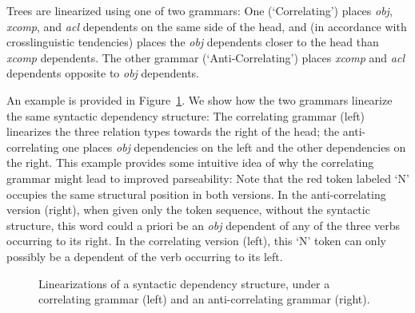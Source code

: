 \documentclass[10pt,twoside,lineno]{article}
\begin{document}
Trees are linearized using one of two grammars: One (`Correlating') places \emph{obj}, \emph{xcomp}, and \emph{acl} dependents on the same side of the head, and (in accordance with crosslinguistic tendencies) places the \emph{obj} dependents closer to the head than \emph{xcomp} dependents.
The other grammar (`Anti-Correlating') places \emph{xcomp} and \emph{acl} dependents opposite to \emph{obj} dependents.

An example is provided in Figure~\ref{fig:sent-dep}.
We show how the two grammars linearize the same syntactic dependency structure:
The correlating grammar (left) linearizes the three relation types towards the right of the head; the anti-correlating one places \emph{obj} dependencies on the left and the other dependencies on the right.
This example provides some intuitive idea of why the correlating grammar might lead to improved parseability:
Note that the red token labeled `N' occupies the same structural position in both versions.
In the anti-correlating version (right), when given only the token sequence, without the syntactic structure, this word could a priori be an \emph{obj} dependent of any of the three verbs occurring to its right.
In the correlating version (left), this `N' token can only possibly be a dependent of the verb occurring to its left.

\begin{figure}[ht]
    \centering
{
}
	\caption{Linearizations of a syntactic dependency structure, under a correlating grammar (left) and an anti-correlating grammar (right).}
	\label{fig:sent-dep}
\end{figure}
\end{document}
